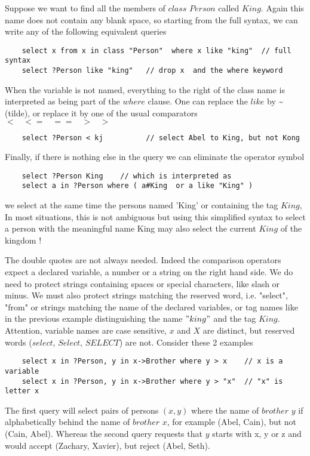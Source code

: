 \documentclass[11pt]{article}
\newcommand{\BL}{\begin{lstlisting}}
\begin{document}
Suppose we want to find all the members of $class$ $Person$ called $King$. Again this name does not
contain any blank space, so starting from the full syntax, we can write any of the following 
equivalent queries
\BL
    select x from x in class "Person"  where x like "king"  // full syntax
    select ?Person like "king"   // drop x  and the where keyword
\end{lstlisting}

When the variable is not named, everything to the right of the class name is interpreted
as being part of the $where$ clause. 
One can replace the $like$ by \~{}  (tilde), or replace it by
one of the usual comparators $< \;\;\; <= \;\;\; == \;\;\; > \;\;\; >$

\BL
    select ?Person < kj          // select Abel to King, but not Kong
\end{lstlisting}

Finally, if there is nothing else in the query we can eliminate the operator symbol
\BL
    select ?Person King    // which is interpreted as 
    select a in ?Person where ( a#King  or a like "King" )
\end{lstlisting}
we select at the same time the persons named 'King' or containing the tag $King$,
In most situations, this is not ambiguous but using this simplified syntax to select a person
with the meaningful name King may also select the current $King$ of the kingdom !

The double quotes are not always needed. Indeed the comparison operators
expect a declared variable, a number or a string on the right hand side. We do need to protect 
strings containing spaces or special characters, like slash or minus. We must also protect 
strings matching the reserved word, i.e. "select", "from"  or strings  matching the name of 
the declared variables, or tag names like in the previous example distinguishing
 the name $"king"$ and the tag $King$. 
Attention, variable names are case sensitive, $x$ and $X$ are distinct, 
but reserved words ($select$, $Select$, $SELECT$) are not. Consider these 2 examples
\BL
    select x in ?Person, y in x->Brother where y > x    // x is a variable
    select x in ?Person, y in x->Brother where y > "x"  // "x" is letter x
\end{lstlisting}
The first query will select pairs of persons $(x, y)$ where the name of $brother$ $y$
if alphabetically behind the name of $brother$ $x$, for example (Abel, Cain), but
not (Cain, Abel). Whereas the second query requests that $y$ starts with x, y or z
and would accept (Zachary, Xavier), but reject (Abel, Seth).
\end{document}

